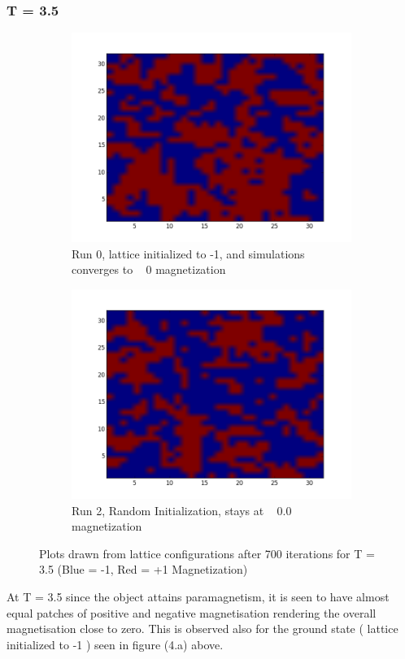 \documentclass[a4paper,11pt]{article}
\begin{document}
\subsubsection{T = 3.5}
\begin{figure}[!htb]
    \begin{subfigure}[b]{0.5\textwidth}
	    \centering
        \includegraphics[scale=0.40]{3_run_0.png}
        \caption{Run 0, lattice initialized to -1, and simulations converges to ~ 0 magnetization}
	    \label{fig:lat3_0}
    \end{subfigure}
    \begin{subfigure}[b]{0.5\textwidth}
        \includegraphics[scale=0.40]{3_run_2.png}
        \caption{Run 2, Random Initialization, stays at ~ 0.0 magnetization}
	    \label{fig:lat3_2}
    \end{subfigure}
    \caption{Plots drawn from lattice configurations after 700 iterations for T = 3.5 (Blue = -1, Red = +1 Magnetization)}
\end{figure}
At T = 3.5 since the object attains paramagnetism, it is seen to have almost equal patches of positive and negative magnetisation rendering the overall magnetisation close to zero. This is observed also for the ground state ( lattice initialized to -1 ) seen in figure (4.a) above.
\end{document}
